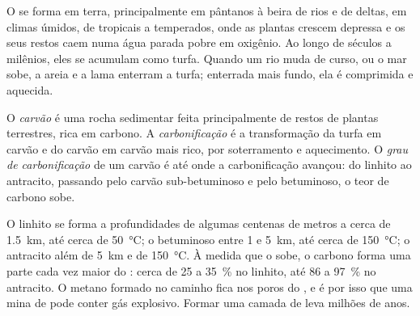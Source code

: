 O  se forma em terra, principalmente em pântanos à beira de rios e de
deltas, em climas úmidos, de tropicais a temperados, onde as plantas crescem
depressa e os seus restos caem numa água parada pobre em oxigênio. Ao longo
de séculos a milênios, eles se acumulam como turfa. Quando um rio muda de
curso, ou o mar sobe, a areia e a lama enterram a turfa; enterrada mais
fundo, ela é comprimida e aquecida.

\begin{definition}\label{def:g11:fossil-fuel-geology:coal}
O \emph{carvão} é uma rocha sedimentar feita
principalmente de restos de plantas terrestres, rica em carbono. A
\emph{carbonificação} é a
transformação da turfa em carvão e do carvão em carvão mais rico, por
soterramento e aquecimento. O \emph{grau de carbonificação} de um carvão
é até onde a carbonificação avançou: do linhito ao antracito, passando pelo
carvão sub-betuminoso e pelo betuminoso, o teor de carbono sobe.
\end{definition}

O linhito se forma a profundidades de algumas centenas de metros a cerca de
\qty{1.5}{km}, até cerca de \qty{50}{\degreeCelsius}; o  betuminoso
entre 1 e \qty{5}{km}, até cerca de \qty{150}{\degreeCelsius}; o antracito
além de \qty{5}{km} e de \qty{150}{\degreeCelsius}. À medida que o  sobe, o carbono forma uma parte cada vez maior do :
cerca de
25 a \qty{35}{\percent} no linhito, até 86 a \qty{97}{\percent} no
antracito. O metano formado no caminho fica nos poros do , e é por
isso que uma mina de  pode conter gás explosivo. Formar uma camada de
 leva milhões de anos.

